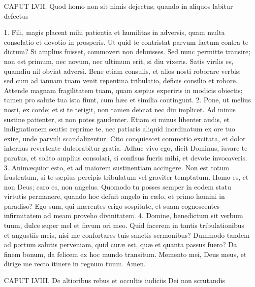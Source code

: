 CAPUT LVII.
Quod homo non sit nimis dejectus, quando in aliquos labitur defectus

1. Fili, magis placent mihi patientia et humilitas in adversis, quam multa consolatio et devotio in prosperis. Ut quid te contristat parvum factum contra te dictum? Si amplius fuisset, commoveri non debuisses. Sed nunc permitte transire; non est primum, nec novum, nec ultimum erit, si diu vixeris. Satis virilis es, quamdiu nil obviat adversi. Bene etiam consulis, et alios nosti roborare verbis; sed cum ad ianuam tuam venit repentina tribulatio, deficis consilio et robore. Attende magnam fragilitatem tuam, quam sæpius experiris in modicis obiectis; tamen pro salute tua ista fiunt, cum hæc et similia contingunt.
2. Pone, ut melius nosti, ex corde; et si te tetigit, non tamen deiciat nec diu implicet. Ad minus sustine patienter, si non potes gaudenter. Etiam si minus libenter audis, et indignationem sentis: reprime te, nec patiaris aliquid inordinatum ex ore tuo exire, unde parvuli scandalizentur. Cito conquiescet commotio excitata, et dolor internus revertente dulcorabitur gratia. Adhuc vivo ego, dicit Dominus, iuvare te paratus, et solito amplius consolari, si confisus fueris mihi, et devote invocaveris.
3. Animæquior esto, et ad maiorem sustinentiam accingere. Non est totum frustratum, si te sæpius percipis tribulatum vel graviter temptatum. Homo es, et non Deus; caro es, non angelus. Quomodo tu posses semper in eodem statu virtutis permanere, quando hoc defuit angelo in cælo, et primo homini in paradiso? Ego sum, qui mærentes erigo sospitate, et suam cognoscentes infirmitatem ad meam proveho divinitatem.
4. Domine, benedictum sit verbum tuum, dulce super mel et favum ori meo. Quid facerem in tantis tribulationibus et angustiis meis, nisi me confortares tuis sanctis sermonibus? Dummodo tandem ad portum salutis perveniam, quid curæ est, quæ et quanta passus fuero? Da finem bonum, da felicem ex hoc mundo transitum. Memento mei, Deus meus, et dirige me recto itinere in regnum tuum. Amen.


CAPUT LVIII.
De altioribus rebus et occultis iudiciis Dei non scrutandis

